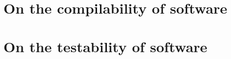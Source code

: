 \section{On the compilability of software}
\label{sec:buildability:related}


\section{On the testability of software}
\label{sec:testability:related}


\label{sec:bug-hunter:related}
